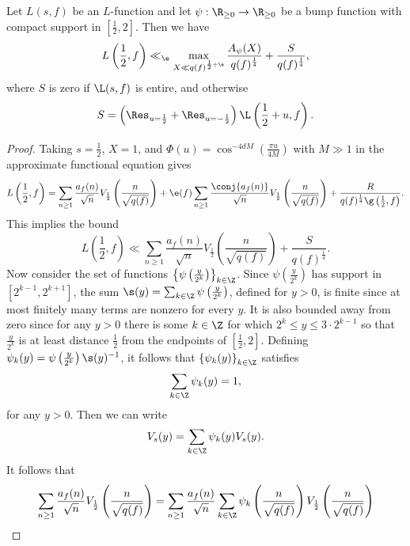     \begin{theorem}
      Let $L(s,f)$ be an $L$-function and let $\psi:\R_{\ge 0} \to \R_{\ge 0}$ be a bump function with compact support in $\left[\frac{1}{2},2\right]$. Then we have
      \[
        L\left(\frac{1}{2},f\right) \ll_{\e} \max_{X \ll q(f)^{\frac{1}{2}+\e}}\frac{A_{\psi}(X)}{q(f)^{\frac{1}{4}}}+\frac{S}{q(f)^{\frac{1}{4}}},
      \]
      where $S$ is zero if $\L(s,f)$ is entire, and otherwise
      \[
        S = \left(\Res_{u = \frac{1}{2}}+\Res_{u = -\frac{1}{2}}\right)\L\left(\frac{1}{2}+u,f\right).
      \]
    \end{theorem}
    \begin{proof}
      Taking $s = \frac{1}{2}$, $X = 1$, and $\Phi(u) = \cos^{-4dM}\left(\frac{\pi u}{4M}\right)$ with $M \gg 1$ in the approximate functional equation gives
      \[
        L\left(\frac{1}{2},f\right) = \sum_{n \ge 1}\frac{a_{f}(n)}{\sqrt{n}}V_{\frac{1}{2}}\left(\frac{n}{\sqrt{q(f)}}\right)+\e(f)\sum_{n \ge 1}\frac{\conj{a_{f}(n)}}{\sqrt{n}}V_{\frac{1}{2}}\left(\frac{n}{\sqrt{q(f)}}\right)+\frac{R}{q(f)^{\frac{1}{4}}\g\left(\frac{1}{2},f\right)}.
      \]
      This implies the bound
      \[
        L\left(\frac{1}{2},f\right) \ll \sum_{n \ge 1}\frac{a_{f}(n)}{\sqrt{n}}V_{\frac{1}{2}}\left(\frac{n}{\sqrt{q(f)}}\right)+\frac{S}{q(f)^{\frac{1}{4}}}.
      \]
      Now consider the set of functions $\left\{\psi\left(\frac{y}{2^{k}}\right)\right\}_{k \in \Z}$. Since $\psi\left(\frac{y}{2^{k}}\right)$ has support in $[2^{k-1},2^{k+1}]$, the sum $\s(y) = \sum_{k \in \Z}\psi\left(\frac{y}{2^{k}}\right)$, defined for $y > 0$, is finite since at most finitely many terms are nonzero for every $y$. It is also bounded away from zero since for any $y > 0$ there is some $k \in \Z$ for which $2^{k} \le y \le 3 \cdot 2^{k-1}$ so that $\frac{y}{2^{k}}$ is at least distance $\frac{1}{2}$ from the endpoints of $\left[\frac{1}{2},2\right]$. Defining $\psi_{k}(y) = \psi\left(\frac{y}{2^{k}}\right)\s(y)^{-1}$, it follows that $\left\{\psi_{k}(y)\right\}_{k \in \Z}$ satisfies
      \[
        \sum_{k \in \Z}\psi_{k}(y) = 1,
      \]
      for any $y > 0$. Then we can write
      \[
        V_{s}(y) = \sum_{k \in \Z}\psi_{k}(y)V_{s}(y).
      \]
      It follows that
      \begin{align*}
        \sum_{n \ge 1}\frac{a_{f}(n)}{\sqrt{n}}V_{\frac{1}{2}}\left(\frac{n}{\sqrt{q(f)}}\right) &= \sum_{n \ge 1}\frac{a_{f}(n)}{\sqrt{n}}\sum_{k \in \Z}\psi_{k}\left(\frac{n}{\sqrt{q(f)}}\right)V_{\frac{1}{2}}\left(\frac{n}{\sqrt{q(f)}}\right) \\

\end{align*}
\end{proof}
